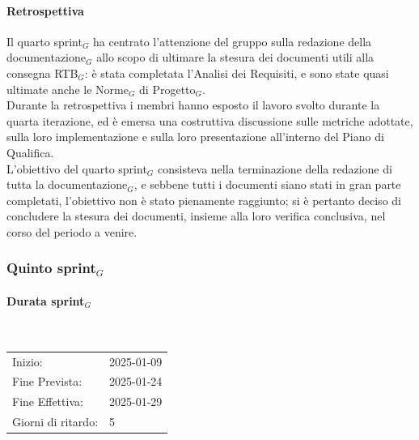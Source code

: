 \documentclass[10pt]{article}
\begin{document}
{{{{{    \paragraph{Retrospettiva}\mbox{}\vspace{0.4em}

    Il quarto sprint$_G$ ha centrato l'attenzione del gruppo sulla redazione della documentazione$_G$ allo scopo di ultimare la stesura dei 
    documenti utili alla consegna RTB$_G$: è stata completata l'Analisi dei Requisiti, e sono state quasi ultimate anche le Norme$_G$ di Progetto$_G$.\\
    Durante la retrospettiva i membri hanno esposto il lavoro svolto durante la quarta iterazione, ed è emersa una costruttiva discussione
    sulle metriche adottate, sulla loro implementazione e sulla loro presentazione all'interno del Piano di Qualifica.\\
    L'obiettivo del quarto sprint$_G$ consisteva nella terminazione della redazione di tutta la documentazione$_G$, e sebbene tutti i documenti siano
    stati in gran parte completati, l'obiettivo non è stato pienamente raggiunto; si è pertanto deciso di concludere la stesura dei documenti,
    insieme alla loro verifica conclusiva, nel corso del periodo a venire.



\newpage
\subsubsection{Quinto sprint$_G$}
\label{quinto-sprint$_G$}
    
    \paragraph{Durata sprint$_G$}\mbox{}\\
    \vspace{-1.5em}
    \begin{table}[h] 
    \renewcommand{\arraystretch}{1.2}  
    \begin{tabular}{ l l }
        Inizio: & 2025-01-09 \\
        Fine Prevista: & 2025-01-24 \\
        Fine Effettiva: & 2025-01-29 \\
        Giorni di ritardo: & 5 \\
    \end{tabular}
    \end{table}
    \vspace{-2em}
    {\renewcommand{\arraystretch}{1.5}%
    
}}}}}}
\end{document}
